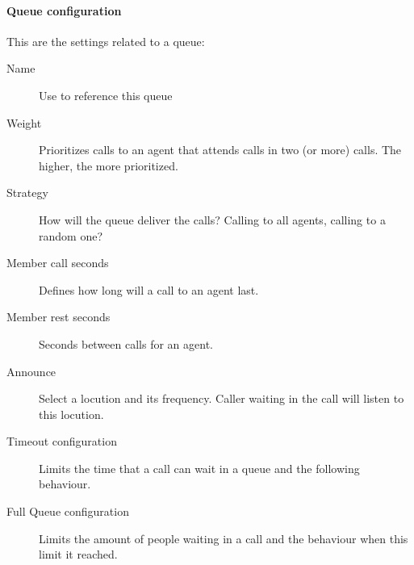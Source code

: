 \documentclass[letterpaper,10pt,english]{sphinxmanual}
\begin{document}
\paragraph{Queue configuration}
\label{administration_portal/client/vpbx/routing_endpoints/queues:queue-configuration}
This are the settings related to a queue:
\begin{description}
\item[{Name}] \leavevmode{}\label{administration_portal/client/vpbx/routing_endpoints/queues:term-name}
Use to reference this queue

\item[{Weight}] \leavevmode{}\label{administration_portal/client/vpbx/routing_endpoints/queues:term-weight}
Prioritizes calls to an agent that attends calls in two (or more) calls. The
higher, the more prioritized.

\item[{Strategy}] \leavevmode{}\label{administration_portal/client/vpbx/routing_endpoints/queues:term-strategy}
How will the queue deliver the calls? Calling to all agents, calling to a
random one?

\item[{Member call seconds}] \leavevmode{}\label{administration_portal/client/vpbx/routing_endpoints/queues:term-member-call-seconds}
Defines how long will a call to an agent last.

\item[{Member rest seconds}] \leavevmode{}\label{administration_portal/client/vpbx/routing_endpoints/queues:term-member-rest-seconds}
Seconds between calls for an agent.

\item[{Announce}] \leavevmode{}\label{administration_portal/client/vpbx/routing_endpoints/queues:term-announce}
Select a locution and its frequency. Caller waiting in the call will listen
to this locution.

\item[{Timeout configuration}] \leavevmode{}\label{administration_portal/client/vpbx/routing_endpoints/queues:term-timeout-configuration}
Limits the time that a call can wait in a queue and the following behaviour.

\item[{Full Queue configuration}] \leavevmode{}\label{administration_portal/client/vpbx/routing_endpoints/queues:term-full-queue-configuration}
Limits the amount of people waiting in a call and the behaviour when this limit
it reached.

\end{description}
\end{document}
